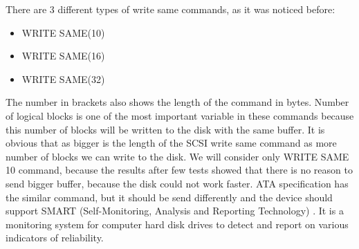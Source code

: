 There are 3 different types of write same commands, as it was noticed before:
\begin{itemize}
	\setlength{\itemsep}{-2mm}
	\item WRITE SAME(10)
	\item WRITE SAME(16)
	\item WRITE SAME(32)
\end{itemize}
The number in brackets also shows the length of the command in bytes. Number of logical blocks is one of the most important variable in these commands because this number of blocks will be written to the disk with the same buffer. It is obvious that as bigger is the length of the SCSI write same command as more number of blocks we can write to the disk. We will consider only WRITE SAME 10 command, because the results after few tests showed that there is no reason to send bigger buffer, because the disk could not work faster. ATA specification has the similar command, but it should be send differently and the device should support SMART (Self-Monitoring, Analysis and Reporting Technology) \cite{ata_spec}. It is a monitoring system for computer hard disk drives to detect and report on various indicators of reliability.

